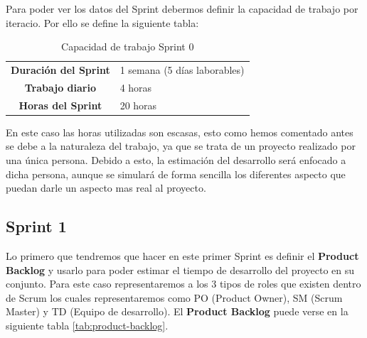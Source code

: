 Para poder ver los datos del Sprint debermos definir la capacidad de trabajo por iteracio. Por ello se define la siguiente tabla:

\begin{table}[H]
	\begin{center}
		\begin{tabular}{| c | p{9cm} |}
			\hline
			
			\textbf{Duración del Sprint} & 1 semana (5 días laborables) \\
			\textbf{Trabajo diario} & 4 horas \\
			\textbf{Horas del Sprint} & 20 horas \\ \hline
		\end{tabular}
		\caption{Capacidad de trabajo Sprint 0}
	\end{center}
\end{table}

En este caso las horas utilizadas son escasas, esto como hemos comentado antes se debe a la naturaleza del trabajo, ya que se trata de un proyecto realizado por una única persona. Debido a esto, la estimación del desarrollo será enfocado a dicha persona, aunque se simulará de forma sencilla los diferentes aspecto que puedan darle un aspecto mas real al proyecto.

\subsection{Sprint 1}

Lo primero que tendremos que hacer en este primer Sprint es definir el \textbf{Product Backlog} y usarlo para poder estimar el tiempo de desarrollo del proyecto en su conjunto. Para este caso representaremos a los 3 tipos de roles que existen dentro de Scrum los cuales representaremos como PO (Product Owner), SM (Scrum Master) y TD (Equipo de desarrollo). El \textbf{Product Backlog} puede verse en la siguiente tabla \ref{tab:product-backlog}.

